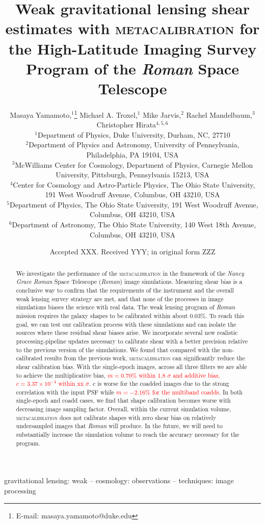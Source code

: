 \documentclass[fleqn,usenatbib]{mnras}
\title[Metacalibration with Roman High-Latitude Imaging Survey]{Weak gravitational lensing shear estimates with \textsc{metacalibration} for the High-Latitude Imaging Survey Program of the \emph{Roman} Space Telescope}
\author[M. Yamamoto et al.]{
Masaya Yamamoto,$^{1}$\thanks{E-mail: masaya.yamamoto@duke.edu}
Michael A. Troxel,$^{1}$
Mike Jarvis,$^{2}$
Rachel Mandelbaum,$^{3}$
Christopher Hirata$^{4,5,6}$
\\
$^{1}$Department of Physics, Duke University, Durham, NC, 27710\\
$^{2}$Department of Physics and Astronomy, University of Pennsylvania, Philadelphia, PA 19104, USA\\
$^{3}$McWilliams Center for Cosmology, Department of Physics, Carnegie Mellon University, Pittsburgh, Pennsylvania 15213, USA\\
$^{4}$Center for Cosmology and Astro-Particle Physics, The Ohio State University, 191 West Woodruff Avenue, Columbus, OH 43210, USA\\
$^{5}$Department of Physics, The Ohio State University, 191 West Woodruff Avenue, Columbus, OH 43210, USA\\
$^{6}$Department of Astronomy, The Ohio State University, 140 West 18th Avenue, Columbus, OH 43210, USA\\
}
\date{Accepted XXX. Received YYY; in original form ZZZ}
\begin{document}
\label{firstpage}
\pagerange{\pageref{firstpage}--\pageref{lastpage}}
\maketitle

\begin{abstract}
We investigate the performance of the \textsc{metacalibration} in the framework of the \emph{Nancy Grace Roman} Space Telescope (\emph{Roman}) image simulations. Measuring shear bias is a conclusive way to confirm that the requirements of the instrument and the overall weak lensing survey strategy are met, and that none of the processes in image simulations biases the science with real data. The weak lensing program of \emph{Roman} mission requires the galaxy shapes to be calibrated within about 0.03\%. To reach this goal, we can test our calibration process with these simulations and can isolate the sources where these residual shear biases arise. We incorporate several new realistic processing-pipeline updates necessary to calibrate shear with a better precision relative to the previous version of the simulations. We found that compared with the non-calibrated results from the previous work, \textsc{metacalibration} can significantly reduce the shear calibration bias. With the single-epoch images, across all three filters we are able to achieve the multiplicative bias, \textcolor{red}{$m=0.70\%$ within 1.8 $\sigma$ and additive bias, $c=3.37\times10^{-4}$ within xx $\sigma$}. $c$ is worse for the coadded images due to the strong correlation with the input PSF while \textcolor{red}{$m=-2.16\%$ for the multiband coadds}. In both single-epoch and coadd cases, we find that shape calibration becomes worse with decreasing image sampling factor. Overall, within the current simulation volume, \textsc{metacalibration} does not calibrate shapes with zero shear bias on relatively undersampled images that \emph{Roman} will produce. In the future, we will need to substantially increase the simulation volume to reach the accuracy necessary for the program. 
\end{abstract}

\begin{keywords}
gravitational lensing: weak -- cosmology: observations -- techniques: image processing
\end{keywords}

\end{document}
